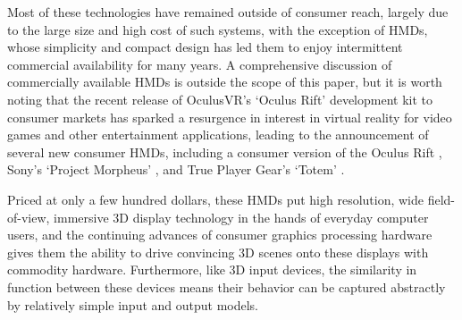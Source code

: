 Most of these technologies have remained outside of consumer reach, largely due to the large size and high cost of such systems, with the exception of HMDs, whose simplicity and compact design has led them to enjoy intermittent commercial availability for many years. A comprehensive discussion of commercially available HMDs is outside the scope of this paper, but it is worth noting that the recent release of OculusVR's `Oculus Rift' development kit to consumer markets has sparked a resurgence in interest in virtual reality for video games and other entertainment applications, leading to the announcement of several new consumer HMDs, including a consumer version of the Oculus Rift \cite{oculus-rift}, Sony's `Project Morpheus' \cite{project-morpheus}, and True Player Gear's `Totem' \cite{true-player-gear}. 

Priced at only a few hundred dollars, these HMDs put high resolution, wide field-of-view, immersive 3D display technology in the hands of everyday computer users, and the continuing advances of consumer graphics processing hardware gives them the ability to drive convincing 3D scenes onto these displays with commodity hardware. Furthermore, like 3D input devices, the similarity in function between these devices means their behavior can be captured abstractly by relatively simple input and output models. 
